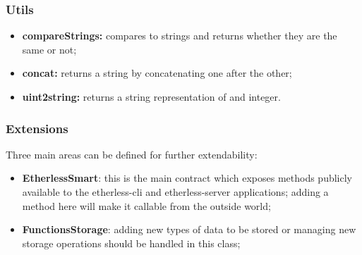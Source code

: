 \subsubsection{Utils}
\begin{itemize}
	\item \textbf{compareStrings:} compares to strings and returns whether they are the same or not;
	\item \textbf{concat:} returns a string by concatenating one after the other;
	\item \textbf{uint2string:} returns a string representation of and integer.
\end{itemize}
\subsubsection{Extensions}
Three main areas can be defined for further extendability:
\begin{itemize}
	\item \textbf{EtherlessSmart}: this is the main contract which exposes methods publicly available to the etherless-cli and etherless-server applications; adding a method here will make it callable from the outside world;
	\item \textbf{FunctionsStorage}: adding new types of data to be stored or managing new storage operations should be handled in this class;
\end{itemize}



